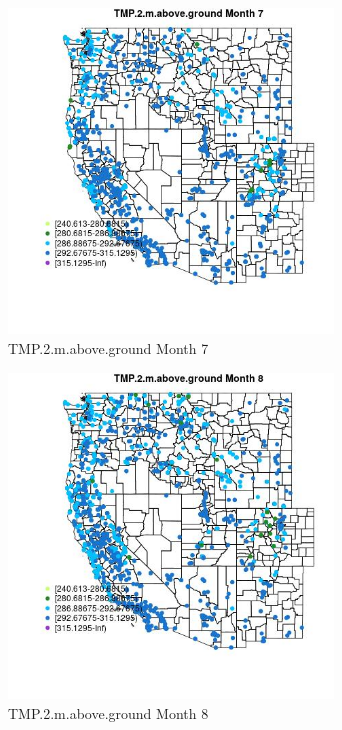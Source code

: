 \begin{figure} 
\centering  
\includegraphics[width=0.77\textwidth]{Code_Outputs/Report_ML_input_PM25_Step4_part_f_de_duplicated_aves_prioritize_24hr_obswNAs_MapObsMo7TMP2maboveground.jpg} 
\caption{\label{fig:Report_ML_input_PM25_Step4_part_f_de_duplicated_aves_prioritize_24hr_obswNAsMapObsMo7TMP2maboveground}TMP.2.m.above.ground Month 7} 
\end{figure} 
 

\clearpage 

\begin{figure} 
\centering  
\includegraphics[width=0.77\textwidth]{Code_Outputs/Report_ML_input_PM25_Step4_part_f_de_duplicated_aves_prioritize_24hr_obswNAs_MapObsMo8TMP2maboveground.jpg} 
\caption{\label{fig:Report_ML_input_PM25_Step4_part_f_de_duplicated_aves_prioritize_24hr_obswNAsMapObsMo8TMP2maboveground}TMP.2.m.above.ground Month 8} 
\end{figure} 
 

